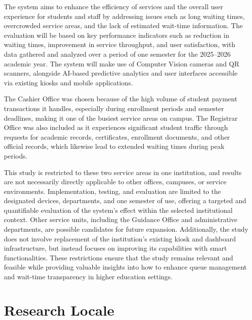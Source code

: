 \documentclass{research}
\begin{document}
The system aims to enhance the efficiency of services and the overall user experience for students and staff by addressing issues such as long waiting times, overcrowded service areas, and the lack of estimated wait-time information. The evaluation will be based on key performance indicators such as reduction in waiting times, improvement in service throughput, and user satisfaction, with data gathered and analyzed over a period of one semester for the 2025--2026 academic year. The system will make use of Computer Vision cameras and QR scanners, alongside AI-based predictive analytics and user interfaces accessible via existing kiosks and mobile applications.

The Cashier Office was chosen because of the high volume of student payment transactions it handles, especially during enrollment periods and semester deadlines, making it one of the busiest service areas on campus. The Registrar Office was also included as it experiences significant student traffic through requests for academic records, certificates, enrollment documents, and other official records, which likewise lead to extended waiting times during peak periods.

This study is restricted to these two service areas in one institution, and results are not necessarily directly applicable to other offices, campuses, or service environments. Implementation, testing, and evaluation are limited to the designated devices, departments, and one semester of use, offering a targeted and quantifiable evaluation of the system's effect within the selected institutional context. Other service units, including the Guidance Office and administrative departments, are possible candidates for future expansion. Additionally, the study does not involve replacement of the institution's existing kiosk and dashboard infrastructure, but instead focuses on improving its capabilities with smart functionalities. These restrictions ensure that the study remains relevant and feasible while providing valuable insights into how to enhance queue management and wait-time transparency in higher education settings.

\section{Research Locale}
\end{document}

